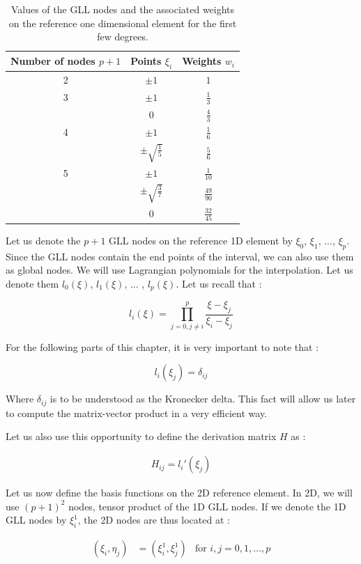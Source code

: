 \begin{table}
\centering
\begin{tabular}{c|cc}
\hline
 Number of nodes $p+1$ & Points $\xi_i$ & Weights $w_i$\\
 \hline
 2 & $\pm 1$ & $1$ \\
 \hline
 3 & $\pm 1$ & $\frac{1}{3}$\\
    & 0			   & $\frac{4}{3}$\\
 \hline
 4 & $\pm 1$ & $\frac{1}{6}$\\
    & $\pm \sqrt{\frac{1}{5}}$  & $\frac{5}{6}$\\
\hline
5 & $\pm 1$ & $\frac{1}{10}$\\
   & $\pm \sqrt{\frac{3}{7}}$ & $\frac{49}{90}$\\
   & $0$ & $\frac{32}{45}$\\
   \hline
\end{tabular}
\caption{Values of the GLL nodes and the associated weights on the reference one dimensional element for the first few degrees.}
\label{gll_values}
\end{table}

Let us denote the $p+1$ GLL nodes on the reference 1D element by $\xi_0$, $\xi_1$, ..., $\xi_p$. Since the GLL nodes contain the end points of the interval, we can also use them as global nodes. We will use Lagrangian polynomials for the interpolation. Let us denote them $l_0(\xi)$, $l_1(\xi)$, ... , $l_p(\xi)$. Let us recall that : 

$$ l_i(\xi) = \prod_{j=0 , j\neq i}^p \frac{\xi - \xi_j}{\xi_i  - \xi_j}$$

For the following parts of this chapter, it is very important to note that :

$$ l_i(\xi_j) = \delta_{ij} $$ 

Where $\delta_{ij}$ is to be understood as the Kronecker delta. This fact will allow us later to compute the matrix-vector product in a very efficient way. 

Let us also use this opportunity to define the derivation matrix $H$ as : 

\begin{align}
H_{ij} = l_i'(\xi_j)
\end{align}

Let us now define the basis functions on the 2D reference element. In 2D, we will use $(p+1)^2$ nodes, tensor product of the 1D GLL nodes. If we denote the 1D GLL nodes by $\xi_i^1$, the 2D nodes are thus located at :

\begin{align*}
(\xi_i, \eta_j) &= (\xi^1_i,\xi^1_j) &\text{for $i,j=0,1,...,p$}
\end{align*}

